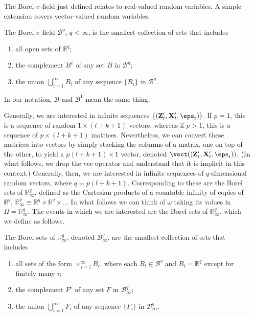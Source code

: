 The Borel $\sigma$-field just defined relates to real-valued random variables. A simple extension covers vector-valued random variables.

\begin{definition}\label{def:borel-sigma-field-q}
The Borel $\sigma$-field $\mathcal{B}^q$, $q < \infty$, is the smallest collection of sets that includes
\begin{enumerate}[label=(\roman*)]
\item all open sets of $\mathbb{R}^q$;
\item the complement $B^c$ of any set $B$ in $\mathcal{B}^q$;
\item the union $\bigcup_{i=1}^{\infty} B_i$ of any sequence $\{B_i\}$ in $\mathcal{B}^q$.
\end{enumerate}
\end{definition}

In our notation, $\mathcal{B}$ and $\mathcal{B}^1$ mean the same thing.

Generally, we are interested in infinite sequences $\{(\mathbf{Z}_t', \mathbf{X}_t', \eps_t)\}$. If $p = 1$, this is a sequence of random $1 \times (l+k+1)$ vectors, whereas if $p > 1$, this is a sequence of $p \times (l+k+1)$ matrices. Nevertheless, we can convert these matrices into vectors by simply stacking the columns of a matrix, one on top of the other, to yield a $p(l+k+1) \times 1$ vector, denoted $\vect((\mathbf{Z}_t', \mathbf{X}_t', \eps_t))$. (In what follows, we drop the vec operator and understand that it is implicit in this context.) Generally, then, we are interested in infinite sequences of $q$-dimensional random vectors, where $q = p(l+k+1)$. Corresponding to these are the Borel sets of $\mathbb{R}_\infty^q$, defined as the Cartesian products of a countable infinity of copies of $\mathbb{R}^q$, $\mathbb{R}_\infty^q \equiv \mathbb{R}^q \times \mathbb{R}^q \times \ldots$ In what follows we can think of $\omega$ taking its values in $\Omega = \mathbb{R}_\infty^q$. The events in which we are interested are the Borel sets of $\mathbb{R}_\infty^q$, which we define as follows.

\begin{definition}\label{def:borel-sets-infinity}
The Borel sets of $\mathbb{R}_\infty^q$, denoted $\mathcal{B}_\infty^q$, are the smallest collection of sets that includes
\begin{enumerate}[label=(\roman*)]
\item all sets of the form $\times_{i=1}^{\infty} B_i$, where each $B_i \in \mathcal{B}^q$ and $B_i = \mathbb{R}^q$ except for finitely many $i$;
\item the complement $F^c$ of any set $F$ in $\mathcal{B}_\infty^q$;
\item the union $\bigcup_{i=1}^{\infty} F_i$ of any sequence $\{F_i\}$ in $\mathcal{B}_\infty^q$.
\end{enumerate}
\end{definition}

